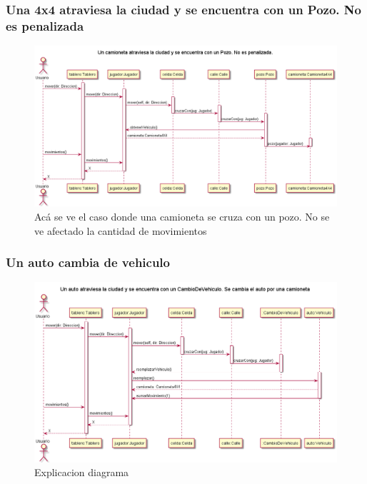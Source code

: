 \documentclass[titlepage,a4paper]{article}
\begin{document}
\subsubsection[Una 4x4 atraviesa la ciudad y se encuentra con un Pozo. No es penalizada]{Una 4x4 atraviesa la ciudad y se encuentra con un Pozo. No es penalizada}

\begin{figure}[H]
  \centering
  \includegraphics[width=1\textwidth]{diagramas/SecuenciaUnaCamionetaCruzaUnPozoYNoEsPenalizado.png}
  \caption{\label{fig:class01} Acá se ve el caso donde una camioneta se cruza con un pozo. No se ve afectado la cantidad de movimientos}
\end{figure}



\subsubsection[Un auto cambia de vehiculo]{Un auto cambia de vehiculo}

\begin{figure}[H]
  \centering
  \includegraphics[width=1\textwidth]{diagramas/SecuenciaAutoCambiaVehiculo.png}
  \caption{\label{fig:class01}Explicacion diagrama}
\end{figure}
\end{document}
